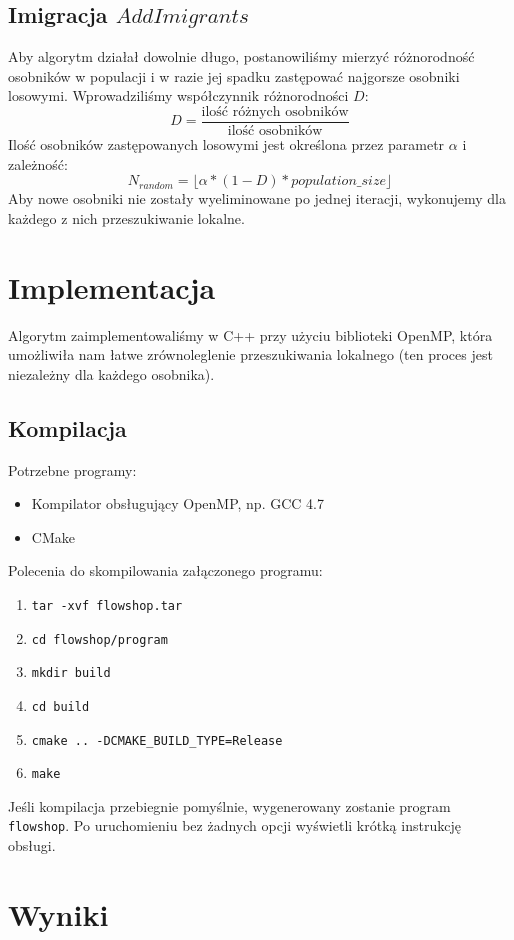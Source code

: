 \documentclass[11pt, a4wide]{article}
\begin{document}
\subsection{Imigracja $AddImigrants$}
Aby algorytm działał dowolnie długo, postanowiliśmy mierzyć różnorodność osobników w populacji i w razie jej
spadku zastępować najgorsze osobniki losowymi. Wprowadziliśmy współczynnik różnorodności $D$:
$$ D = \frac{\text{ilość różnych osobników}}{\text{ilość osobników}} $$
Ilość osobników zastępowanych losowymi jest określona przez parametr $\alpha$ i zależność:
$$ N_{random} = \lfloor \alpha * (1 - D) * population\_size  \rfloor $$
Aby nowe osobniki nie zostały wyeliminowane po jednej iteracji, wykonujemy dla każdego z nich przeszukiwanie
lokalne.




\section{Implementacja}
Algorytm zaimplementowaliśmy w C++ przy użyciu biblioteki OpenMP, która umożliwiła nam łatwe zrównoleglenie
przeszukiwania lokalnego (ten proces jest niezależny dla każdego osobnika).

\subsection{Kompilacja}
Potrzebne programy:
\begin{itemize}
  \item Kompilator obsługujący OpenMP, np. GCC 4.7
  \item CMake
\end{itemize}
Polecenia do skompilowania załączonego programu:
\begin{enumerate}
  \item \verb|tar -xvf flowshop.tar|
  \item \verb|cd flowshop/program|
  \item \verb|mkdir build|
  \item \verb|cd build|
  \item \verb|cmake .. -DCMAKE_BUILD_TYPE=Release|
  \item \verb|make|
\end{enumerate}
Jeśli kompilacja przebiegnie pomyślnie, wygenerowany zostanie program \verb|flowshop|. Po uruchomieniu
bez żadnych opcji wyświetli krótką instrukcję obsługi.





\section{Wyniki}
\end{document}

